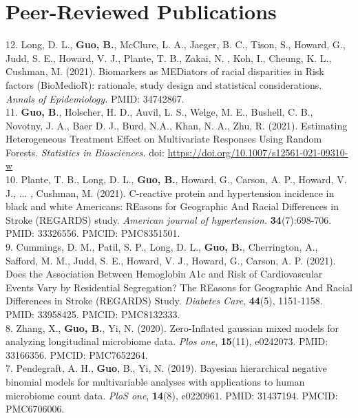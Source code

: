 \section{Peer-Reviewed Publications}

\vspace{-3ex}

12. Long, D. L., \textbf{Guo, B.}, McClure, L. A., Jaeger, B. C., Tison, S., Howard, G., Judd, S. E., Howard, V. J., Plante, T. B., Zakai, N. , Koh, I., Cheung, K. L., Cushman, M. (2021). Biomarkers as MEDiators of racial disparities in Risk factors (BioMedioR): rationale, study design and statistical considerations. \textit{Annals of Epidemiology.} PMID: 34742867. \\

11. {\bf Guo, B}., Holscher, H. D., Auvil, L. S., Welge, M. E., Bushell, C. B., Novotny, J. A., Baer D. J., Burd, N.A., Khan, N. A., Zhu, R. (2021). Estimating Heterogeneous Treatment Effect on Multivariate Responses Using Random Forests. {\it Statistics in Biosciences.} doi: \url{https://doi.org/10.1007/s12561-021-09310-w}\\

10. Plante, T. B., Long, D. L., \textbf{Guo, B.}, Howard, G., Carson, A. P., Howard, V. J., ... , Cushman, M. (2021). C-reactive protein and hypertension incidence in black and white Americans: REasons for Geographic And Racial Differences in Stroke (REGARDS) study. \textit{American journal of hypertension.} {\bf 34}(7):698-706. PMID: 33326556. PMCID: PMC8351501. \\

9. Cummings, D. M., Patil, S. P., Long, D. L., {\bf Guo, B.}, Cherrington, A., Safford, M. M., Judd, S. E., Howard, V. J., Howard, G., Carson, A. P. (2021). Does the Association Between Hemoglobin A1c and Risk of Cardiovascular Events Vary by Residential Segregation? The REasons for Geographic And Racial Differences in Stroke (REGARDS) Study. {\it Diabetes Care}, {\bf 44}(5), 1151-1158. PMID: 33958425. PMCID: PMC8132333.\\

8. Zhang, X., {\bf Guo, B.}, Yi, N. (2020). Zero-Inflated gaussian mixed models for analyzing longitudinal microbiome data. {\it Plos one}, {\bf 15}(11), e0242073. PMID: 33166356. PMCID: PMC7652264.\\

7. Pendegraft, A. H., {\bf Guo}, B., Yi, N. (2019). Bayesian hierarchical negative binomial models for multivariable analyses with applications to human microbiome count data. {\it PloS one}, {\bf 14}(8), e0220961. PMID: 31437194. PMCID: PMC6706006.\\

